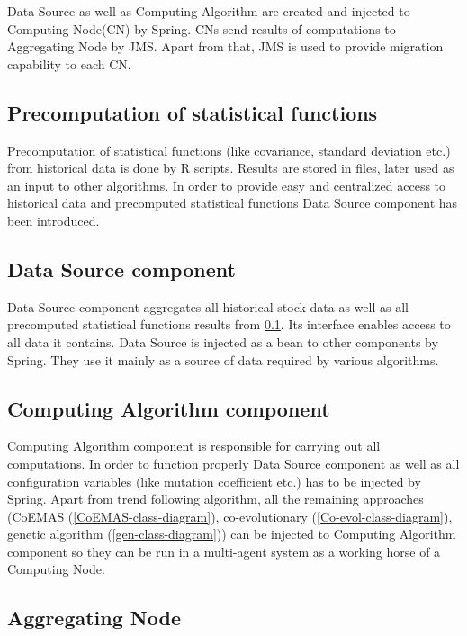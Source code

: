 Data Source as well as Computing Algorithm are created and injected to Computing Node(CN) by Spring. 
CNs send results of computations to Aggregating Node by JMS. 
Apart from that, JMS is used to provide migration capability to each CN.


\subsection{Precomputation of statistical functions}
\label{precompute}
Precomputation of statistical functions (like covariance, standard deviation etc.) from historical data is done by R scripts. 
Results are stored in files, later used as an input to other algorithms.
In order to provide easy and centralized access to historical data and precomputed statistical functions Data Source component has been introduced. 

\subsection{Data Source component}
\label{dataSource}

Data Source component aggregates all historical stock data as well as all precomputed statistical functions results from \ref{precompute}.   
Its interface enables access to all data it contains. Data Source is injected as a bean to other components by Spring.
They use it mainly as a source of data required by various algorithms.

\subsection{Computing Algorithm component}

Computing Algorithm component is responsible for carrying out all computations.
In order to function properly Data Source component as well as all configuration variables (like mutation coefficient etc.) has to be injected by Spring.
Apart from trend following algorithm, all the remaining approaches (CoEMAS (\ref{CoEMAS-class-diagram}), co-evolutionary (\ref{Co-evol-class-diagram}),
 genetic algorithm (\ref{gen-class-diagram})) can be injected to Computing Algorithm component so they can be run
 in a multi-agent system as a working horse of a Computing Node.


\subsection{Aggregating Node}

